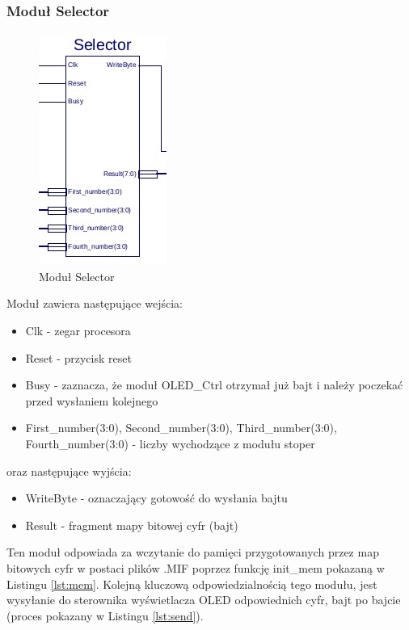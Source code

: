 \documentclass[]{article}
\begin{document}
	\subsubsection{Moduł Selector}
	\begin{figure}[H]
		\includegraphics[width=.4\linewidth]{img/selector.jpg}
		\centering
		\caption{Moduł Selector}
		\label{fig:selector}
	\end{figure}
	Moduł zawiera następujące wejścia:
	\begin{itemize}
		\item Clk - zegar procesora
		\item Reset - przycisk reset
		\item Busy - zaznacza, że moduł OLED\_Ctrl otrzymał już bajt i należy poczekać przed wysłaniem kolejnego
		\item First\_number(3:0), Second\_number(3:0), Third\_number(3:0),\\ Fourth\_number(3:0) - liczby wychodzące z modułu stoper
	\end{itemize}
	oraz następujące wyjścia:
	\begin{itemize}
		\item WriteByte - oznaczający gotowość do wysłania bajtu
		\item Result - fragment mapy bitowej cyfr (bajt)
	\end{itemize}
	Ten moduł odpowiada za wczytanie do pamięci przygotowanych przez map bitowych cyfr w postaci plików .MIF poprzez funkcję init\_mem pokazaną w Listingu \ref{lst:mem}. Kolejną kluczową odpowiedzialnością tego modułu, jest wysyłanie do sterownika wyświetlacza OLED odpowiednich cyfr, bajt po bajcie (proces pokazany w Listingu \ref{lst:send}).
\end{document}
